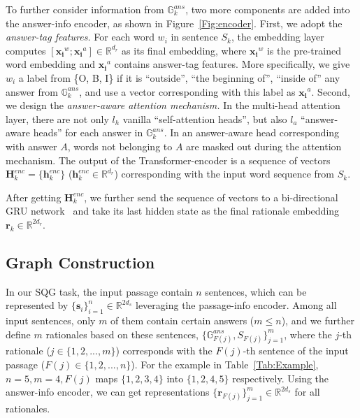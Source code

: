 \documentclass[11pt,a4paper]{article}
\begin{document}
To further consider information from $\mathbb{G}^{ans}_k$, two more components are added into the answer-info encoder, as shown in Figure~\ref{Fig:encoder}.
First, we adopt the \textit{answer-tag features.} For each word $w_i$ in sentence $S_k$, the embedding layer computes $[\bm{x_i}^w; \bm{x_i}^a] \in \mathbb{R}^{d_r}$ as its final embedding, where $\bm{x_i}^w$ is the pre-trained word embedding and $\bm{x_i}^a$ contains answer-tag features. More specifically, we give $w_i$ a label from \{O, B, I\} if it is ``outside'', ``the beginning of'', ``inside of'' any answer from $\mathbb{G}^{ans}_k$, and use a vector corresponding with this label as $\bm{x_i}^a$. Second, we design the \textit{answer-aware attention mechanism.} In the multi-head attention layer, there are not only $l_h$ vanilla ``self-attention heads'', but also $l_a$ ``answer-aware heads'' for each answer in $\mathbb{G}^{ans}_k$. In an answer-aware head corresponding with answer $A$, words not belonging to $A$ are masked out during the attention mechanism. The output of the Transformer-encoder is a sequence of vectors $\bm{H}_k^{enc} = \{\bm{h}_k^{enc}\}$ ($\bm{h}_k^{enc} \in \mathbb{R}^{d_r}$) corresponding with the input word sequence from $S_k$. 

After getting $\bm{H}_k^{enc}$, we further send the sequence of vectors to a bi-directional GRU network~\cite{chung2014empirical} and take its last hidden state as the final rationale embedding $\bm{r}_k \in \mathbb{R}^{2 d_r}$.

\subsection{Graph Construction}
In our SQG task, the input passage contain $n$ sentences, which can be represented by $\{\bm{s}_i\}_{i=1}^n \in \mathbb{R}^{2 d_s}$ leveraging the passage-info encoder.
Among all input sentences, only $m$ of them contain certain answers ($m \le n$), and we further define $m$ rationales based on these sentences, $ \{\mathbb{G}^{ans}_{F(j)}, S_{F(j)}\}_{j=1}^m$, where the $j$-th rationale ($j \in \{1, 2, ..., m\}$) corresponds with the $F(j)$-th sentence of the input passage ($F(j) \in \{1, 2, ..., n\}$). For the example in Table~\ref{Tab:Example}, $n = 5, m = 4, F(j)$ maps $\{1, 2, 3, 4\}$ into $\{1, 2, 4, 5\}$ respectively. 
Using the answer-info encoder, we can get representations $\{\bm{r}_{F(j)}\}_{j=1}^m \in \mathbb{R}^{2 d_s}$ for all rationales. 
\end{document}
